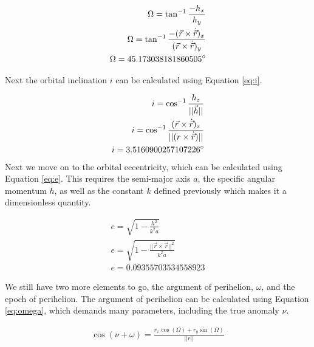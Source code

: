 \documentclass{article}
\begin{document}
\begin{equation}
    \label{eq:Omega}
    \begin{aligned}
        \Omega = \tan^{-1}\frac{-h_x}{h_y} \\ 
        \Omega = \tan^{-1}\frac{-(\vec{r} \times \dot{\vec{r}})_x}{(\vec{r} \times \dot{\vec{r}})_y} \\
        \Omega = 45.173038181860505 \degree
    \end{aligned}
\end{equation}

\noindent
Next the orbital inclination $i$ can be calculated using Equation \ref{eq:i}.

\begin{equation}
    \label{eq:i}
    \begin{aligned}
        i = \cos^{-1}\frac{h_z}{||\vec{h}||} \\
        i = \cos^{-1}\frac{(\vec{r} \times \dot{\vec{r}})_z}{||(r \times \dot{\vec{r}})||} \\
        i = 3.5160900257107226 \degree
    \end{aligned}
\end{equation}
\noindent
Next we move on to the orbital eccentricity, which can be calculated using Equation \ref{eq:e}. This requires the 
semi-major axis $a$, the specific angular momentum $h$, as well as the constant $k$ defined previously which makes it a dimensionless
quantity.

\begin{equation}
    \label{eq:e}
    \begin{aligned}
        e = \sqrt{1 - \frac{h^2}{k^2a}} \\
        e = \sqrt{1 - \frac{||\vec{r} \times \dot{\vec{r}}||^2}{k^2a}} \\
        e = 0.09355703534558923
    \end{aligned}
\end{equation}

\noindent 
We still have two more elements to go, the argument of perihelion, $\omega$, and the epoch of perihelion. The argument of perihelion can be calculated 
using Equation \ref{eq:omega}, which demands many parameters, including the true anomaly $\nu$. 

\begin{equation}
    \label{eq:omega}
    \begin{aligned}
        \cos(\nu + \omega) = \frac{r_x\cos(\Omega) + r_y\sin(\Omega)}{||r||}
    \end{aligned}
\end{equation}
\end{document}
